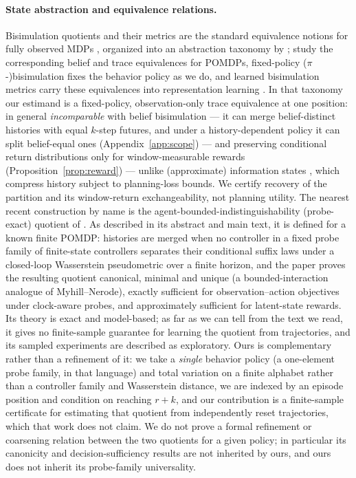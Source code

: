 \documentclass{article}
\begin{document}
\paragraph{State abstraction and equivalence relations.}
Bisimulation quotients and their metrics are the standard equivalence
notions for fully observed MDPs
\citep{givan2003equivalence,ferns2004metrics}, organized into an abstraction
taxonomy by \citet{li2006towards}; \citet{castro2009equivalence} study the
corresponding belief and trace equivalences for POMDPs, fixed-policy
($\pi$-)bisimulation \citep{castro2020scalable} fixes the behavior policy as
we do, and learned bisimulation metrics carry these equivalences into
representation learning \citep{zhang2021learning,castro2021mico}.  In that taxonomy
our estimand is a fixed-policy, observation-only trace equivalence at one
position: in general \emph{incomparable} with belief bisimulation --- it can
merge belief-distinct histories with equal $k$-step futures, and under a
history-dependent policy it can split belief-equal ones
(Appendix~\ref{app:scope}) --- and
preserving conditional return distributions only for window-measurable
rewards (Proposition~\ref{prop:reward}) --- unlike (approximate)
information states \citep{subramanian2022approximate}, which compress
history subject to planning-loss bounds.  We certify recovery of the
partition and its window-return exchangeability, not planning utility.
The nearest recent construction by name is the agent-bounded-indistinguishability
(probe-exact) quotient of \citet{nixon2026myhill}.  As described in its
abstract and main text, it is defined for a known finite POMDP: histories are
merged when no controller in a fixed probe family of finite-state controllers
separates their conditional suffix laws under a closed-loop Wasserstein
pseudometric over a finite horizon, and the paper proves the resulting
quotient canonical, minimal and unique (a bounded-interaction analogue of
Myhill--Nerode), exactly sufficient for observation--action objectives under
clock-aware probes, and approximately sufficient for latent-state rewards.
Its theory is exact and model-based; as far as we can tell from the text we
read, it gives no finite-sample guarantee for learning the quotient from
trajectories, and its sampled experiments are described as exploratory.
Ours is complementary rather than a refinement of it: we take
a \emph{single} behavior policy (a one-element probe family, in that
language) and total variation on a finite alphabet rather than a controller
family and Wasserstein distance, we are indexed by an episode position and
condition on reaching $r+k$, and our contribution is a finite-sample
certificate for estimating that quotient from independently reset
trajectories, which that work does not claim.  We do not prove a formal
refinement or coarsening relation between the two quotients for a given
policy; in particular its canonicity and decision-sufficiency results are
not inherited by ours, and ours does not inherit its probe-family
universality.
\end{document}
